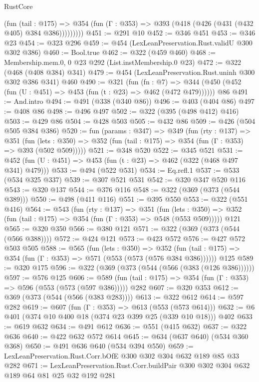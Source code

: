 \begin{lexlean}{RustCore}
\begin{coremodule}
            (fun (tail : @175) =>
            @354 (fun (Γ : @353) => @393 (@418 (@426 (@431 (@432 @405) @384 @386)))))))))
@451 := @291 @10
@452 := @346 @451
@453 := @346 @23
@454 := @323 @296
@459 := @454 (LexLeanPreservation.Rust.validU @300 @302 @386)
@460 := Bool.true
@462 := @322 (@459 @460)
@468 := Membership.mem.{0, 0} @23 @292 (List.instMembership.{0} @23)
@472 := @322 (@468 (@408 @384) @341)
@479 := @454 (LexLeanPreservation.Rust.uninh @300 @302 @386 @341) @460
@490 := @321
    (fun (fn : @7) =>
    @344 (@450 (@452 (fun (U : @451) => @453 (fun (t : @23) => @462 (@472 @479))))))
    @86
@491 := And.intro
@494 := @491 (@338 (@340 @86))
@496 := @403 (@404 @86)
@497 := @408 @86
@498 := @496 @497
@502 := @322 (@395 (@498 @412) @416)
@503 := @429 @86
@504 := @428 @503
@505 := @432 @86
@509 := @426 (@504 @505 @384 @386)
@520 := fun (params : @347) =>
  @349
    (fun (rty : @137) =>
    @351
      (fun (lets : @350) => @352 (fun (tail : @175) => @354 (fun (Γ : @353) => @393 (@502 @509)))))
@521 := @348 @520
@522 := @345 @521
@531 := @452 (fun (U : @451) => @453 (fun (t : @23) => @462 (@322 (@468 @497 @341) @479)))
@533 := @494 (@522 @531)
@534 := Eq.refl.{1}
@537 := @533 (@534 @325 @337)
@539 := @307 @521 @531
@542 := @320 @347 @520 @116
@543 := @320 @137
@544 := @376 @116
@548 := @322 (@369 (@373 (@544 @389)))
@550 := @498 (@411 @116)
@551 := @395 @550
@553 := @322 (@551 @416)
@564 := @543
    (fun (rty : @137) =>
    @351
      (fun (lets : @350) => @352 (fun (tail : @175) => @354 (fun (Γ : @353) => @548 (@553 @509)))))
    @121
@565 := @320 @350
@566 := @380 @121
@571 := @322 (@369 (@373 (@544 (@566 @388))))
@572 := @424 @121
@573 := @423 @572
@576 := @427 @572 @503 @505
@588 := @565
    (fun (lets : @350) =>
    @352 (fun (tail : @175) => @354 (fun (Γ : @353) => @571 (@553 (@573 (@576 @384 @386))))))
    @125
@589 := @320 @175
@596 := @322 (@369 (@373 (@544 (@566 (@383 (@126 @386))))))
@597 := @576 @125
@606 := @589 (fun (tail : @175) => @354 (fun (Γ : @353) => @596 (@553 (@573 (@597 @386))))) @282
@607 := @320 @353
@612 := @369 (@373 (@544 (@566 (@383 @283))))
@613 := @322 @612
@614 := @597 @282
@619 := @607 (fun (Γ : @353) => @613 (@553 (@573 @614)))
@632 := @6 @401 (@374 @10 @400 @18 (@374 @23 @399 @25 (@339 @10 @18))) @402
@633 := @619 @632
@634 := @491 @612
@636 := @551 (@415 @632)
@637 := @322 @636
@640 := @422 @632 @572 @614
@645 := @634 (@637 @640) (@534 @360 @368)
@650 := @491 @636 @640 (@534 @394 @550)
@659 := LexLeanPreservation.Rust.Corr.bOfE @300 @302 @304 @632 @189 @85 @33 @282
@671 := LexLeanPreservation.Rust.Corr.buildPair @300 @302 @304 @632 @189 @64 @81 @25 @32 @192 @281

\end{coremodule}
\end{lexlean}
